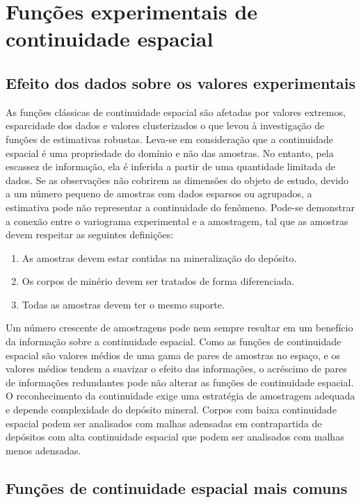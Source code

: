 \section{Funções experimentais de continuidade espacial}

\subsection{Efeito dos dados sobre os valores experimentais}

As funções clássicas de continuidade espacial são afetadas por valores extremos, esparcidade dos dados e valores clusterizados o que levou à investigação de funções de estimativas robustas. Leva-se em consideração que a continuidade espacial é uma propriedade do domínio e não das amostras. No entanto, pela escassez de informação, ela é inferida a partir de uma quantidade limitada de dados. Se as observações não cobrirem as dimensões do objeto de estudo, devido a um número pequeno de amostras com dados esparsos ou agrupados, a estimativa pode não representar a continuidade do fenômeno. Pode-se demonstrar a conexão entre o variograma experimental e a amostragem, tal que as amostras devem respeitar as seguintes definições:

\begin{enumerate}
	\item As amostras devem estar contidas na mineralização do depósito.
	\item Os corpos de minério devem ser tratados de forma diferenciada.
	\item Todas as amostras devem ter o mesmo suporte.	
\end{enumerate}

Um número crescente de amostragens pode nem sempre resultar em um benefício da informação sobre a continuidade espacial. Como as funções de continuidade espacial são valores médios de uma gama de pares de amostras no espaço, e os valores médios tendem a suavizar o efeito das informações, o acréscimo de pares de informações redundantes pode não alterar as funções de continuidade espacial. O reconhecimento da continuidade exige uma estratégia de amostragem adequada e depende complexidade do depósito mineral. Corpos com baixa continuidade espacial podem ser analisados com malhas adensadas em contrapartida de depósitos com alta continuidade espacial que podem ser analisados com malhas menos adensadas. 

\subsection{Funções de continuidade espacial mais comuns}

